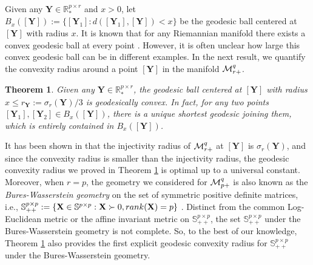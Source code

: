 \documentclass[11pt]{article}
\newtheorem{Theorem}{Theorem}
\newcommand{\bbR}{\mathbb{R}}
\newcommand{\bbS}{\mathbb{S}}
\newcommand{\0}{{\mathbf{0}}}
\newcommand{\1}{{\mathbf{1}}}
\newcommand{\X}{{\mathbf{X}}}
\newcommand{\Y}{{\mathbf{Y}}}
\newcommand{\cM}{{\cal M}}
\newcommand{\rank}{{\rm rank}}
\newcommand{\nc}{\normalcolor}
\begin{document}
Given any $\Y \in \bbR^{p \times r}_*$ and $x > 0$, let $B_x([\Y]) := \{ [\Y_1]: d([\Y_1],[\Y]) < x \}$ be the geodesic ball centered at $[\Y]$ with radius $x$. It is known that for any Riemannian manifold there exists a convex geodesic ball at every point \cite[Chapter 3.4]{do1992riemannian}. However, it is often unclear how large this convex geodesic ball can be in different examples. In the next result, we quantify the convexity radius around a point $[\Y]$ in the manifold $\cM_{r+}^q$.
\begin{Theorem} \label{th: convexity-radius-Mq}
	Given any $\Y \in \bbR^{p \times r}_*$, the geodesic ball centered at $[\Y]$ with radius $x \leq r_\Y := \sigma_r(\Y)/3$ \nc is geodesically convex. In fact, for any two points $[\Y_1], [\Y_2] \in B_{x }([\Y])$, there is a unique shortest geodesic joining them, which is entirely contained in $B_{x }([\Y])$. \nc
\end{Theorem}
It has been shown in \cite[Theorem 6.3]{massart2020quotient} that the injectivity radius of $\cM_{r+}^q$ at $[\Y]$ is $\sigma_r(\Y)$, and since the convexity radius is smaller \nc than the injectivity radius, the geodesic convexity radius we proved in Theorem \ref{th: convexity-radius-Mq} is optimal up to a universal constant. Moreover, when $r = p$, the geometry we considered for $\cM_{p+}^q$ is also known as the {\it Bures-Wasserstein geometry} on the set of symmetric positive definite matrices, i.e., $\bbS^{p \times p}_{++} := \{\X \in \bbS^{p \times p}: \X \succ 0, \rank(\X) = p \}$ \cite{malago2018wasserstein,bhatia2019bures,oostrum2022bures}. Distinct from the common Log-Euclidean metric \cite{arsigny2007geometric} or the affine invariant metric \cite{moakher2005differential} on $\bbS_{++}^{p \times p}$, the set $\bbS_{++}^{p \times p}$ under the Bures-Wasserstein geometry is not complete. So, to the best of our knowledge, Theorem \ref{th: convexity-radius-Mq} also provides the first explicit geodesic convexity radius for $\bbS_{++}^{p \times p}$ under the Bures-Wasserstein geometry.

\end{document}
